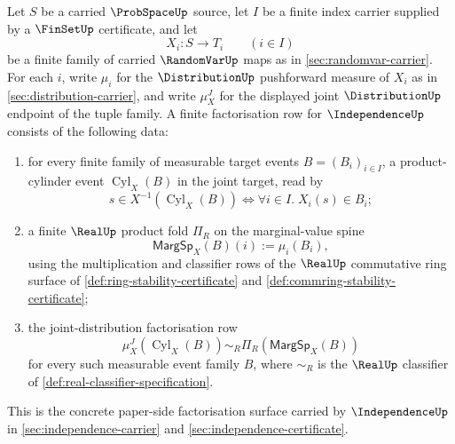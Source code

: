 \begin{definition}
\label{def:independence-finite-factorisation-row}
Let $S$ be a carried $\ProbSpaceUp$ source, let $I$ be a finite index carrier supplied by a $\FinSetUp$ certificate, and let
$$
X_i:S\to T_i\qquad (i\in I)
$$
be a finite family of carried $\RandomVarUp$ maps as in \autoref{sec:randomvar-carrier}. For each $i$, write $\mu_i$ for the $\DistributionUp$ pushforward measure of $X_i$ as in \autoref{sec:distribution-carrier}, and write $\mu_X^J$ for the displayed joint $\DistributionUp$ endpoint of the tuple family. A finite factorisation row for $\IndependenceUp$ consists of the following data:
\begin{enumerate}
\item for every finite family of measurable target events $B=(B_i)_{i\in I}$, a product-cylinder event $\operatorname{Cyl}_X(B)$ in the joint target, read by
$$
s\in X^{-1}(\operatorname{Cyl}_X(B))
\Longleftrightarrow
\forall i\in I.\;X_i(s)\in B_i;
$$
\item a finite $\RealUp$ product fold $\Pi_R$ on the marginal-value spine
$$
\mathsf{MargSp}_X(B)(i):=\mu_i(B_i),
$$
using the multiplication and classifier rows of the $\RealUp$ commutative ring surface of \autoref{def:ring-stability-certificate} and \autoref{def:commring-stability-certificate};
\item the joint-distribution factorisation row
$$
\mu_X^J(\operatorname{Cyl}_X(B))\sim_R\Pi_R(\mathsf{MargSp}_X(B))
$$
for every such measurable event family $B$, where $\sim_R$ is the $\RealUp$ classifier of \autoref{def:real-classifier-specification}.
\end{enumerate}
This is the concrete paper-side factorisation surface carried by $\IndependenceUp$ in \autoref{sec:independence-carrier} and \autoref{sec:independence-certificate}.
\end{definition}

